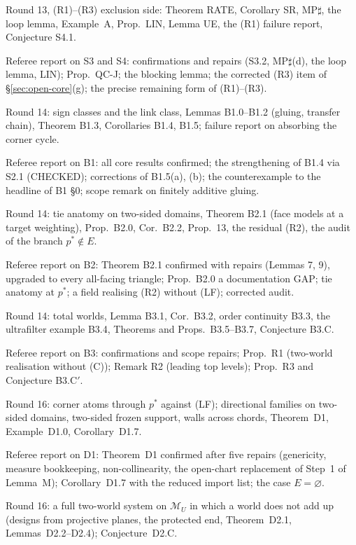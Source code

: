 \documentclass[11pt]{article}
\theoremstyle{definition}
\theoremstyle{remark}
\newcommand{\M}{\mathcal M}
\begin{document}
\begin{description}[leftmargin=*,font=\normalfont\ttfamily,style=nextline]
\item[S4\_notes.md] Round 13, (R1)--(R3) exclusion side: Theorem RATE, Corollary SR, MP$\sharp$, the loop lemma, Example~A, Prop.~LIN, Lemma UE, the (R1) failure report, Conjecture S4.1.
\item[S34\_referee.md] Referee report on S3 and S4: confirmations and repairs (S3.2, MP$\sharp$(d), the loop lemma, LIN); Prop.~QC-J; the blocking lemma; the corrected (R3) item of \S\ref{sec:open-core}(g); the precise remaining form of (R1)--(R3).
\item[B1\_notes.md] Round 14: sign classes and the link class, Lemmas B1.0--B1.2 (gluing, transfer chain), Theorem B1.3, Corollaries B1.4, B1.5; failure report on absorbing the corner cycle.
\item[B1\_referee.md] Referee report on B1: all core results confirmed; the strengthening of B1.4 via S2.1 (CHECKED); corrections of B1.5(a), (b); the counterexample to the headline of B1 \S0; scope remark on finitely additive gluing.
\item[B2\_notes.md] Round 14: tie anatomy on two-sided domains, Theorem B2.1 (face models at a target weighting), Prop.~B2.0, Cor.~B2.2, Prop.~13, the residual (R2), the audit of the branch $p^*\notin E$.
\item[B2\_referee.md] Referee report on B2: Theorem B2.1 confirmed with repairs (Lemmas 7, 9), upgraded to every all-facing triangle; Prop.~B2.0 a documentation GAP; tie anatomy at $p^*$; a field realising (R2) without (LF); corrected audit.
\item[B3\_notes.md] Round 14: total worlds, Lemma B3.1, Cor.~B3.2, order continuity B3.3, the ultrafilter example B3.4, Theorems and Props.~B3.5--B3.7, Conjecture B3.C.
\item[B3\_referee.md] Referee report on B3: confirmations and scope repairs; Prop.~R1 (two-world realisation without (C)); Remark R2 (leading top levels); Prop.~R3 and Conjecture B3.C$'$.
\item[D1\_notes.md] Round 16: corner atoms through $p^*$ against (LF); directional families on two-sided domains, two-sided frozen support, walls across chords, Theorem~D1, Example~D1.0, Corollary~D1.7.
\item[D1\_referee.md] Referee report on D1: Theorem~D1 confirmed after five repairs (genericity, measure bookkeeping, non-collinearity, the open-chart replacement of Step~1 of Lemma~M); Corollary~D1.7 with the reduced import list; the case $E=\varnothing$.
\item[D2\_notes.md] Round 16: a full two-world system on $\M_U$ in which a world does not add up (designs from projective planes, the protected end, Theorem~D2.1, Lemmas~D2.2--D2.4); Conjecture~D2.C.

\end{description}
\end{document}
